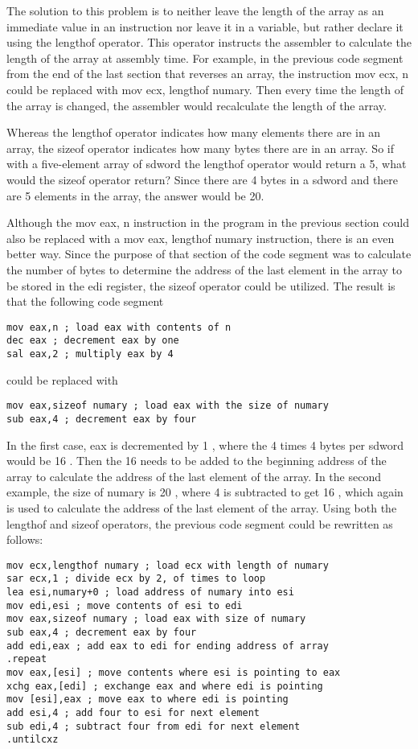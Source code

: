 \documentclass[10pt]{article}
\begin{document}
The solution to this problem is to neither leave the length of the array as an immediate value in an instruction nor leave it in a variable, but rather declare it using the lengthof operator. This operator instructs the assembler to calculate the length of the array at assembly time. For example, in the previous code segment from the end of the last section that reverses an array, the instruction mov ecx, n could be replaced with mov ecx, lengthof numary. Then every time the length of the array is changed, the assembler would recalculate the length of the array.

Whereas the lengthof operator indicates how many elements there are in an array, the sizeof operator indicates how many bytes there are in an array. So if with a five-element array of sdword the lengthof operator would return a 5, what would the sizeof operator return? Since there are 4 bytes in a sdword and there are 5 elements in the array, the answer would be 20.

Although the mov eax, n instruction in the program in the previous section could also be replaced with a mov eax, lengthof numary instruction, there is an even better way. Since the purpose of that section of the code segment was to calculate the number of bytes to determine the address of the last element in the array to be stored in the edi register, the sizeof operator could be utilized. The result is that the following code segment

\begin{verbatim}
mov eax,n ; load eax with contents of n
dec eax ; decrement eax by one
sal eax,2 ; multiply eax by 4
\end{verbatim}

could be replaced with

\begin{verbatim}
mov eax,sizeof numary ; load eax with the size of numary
sub eax,4 ; decrement eax by four
\end{verbatim}

In the first case, eax is decremented by 1 , where the 4 times 4 bytes per sdword would be 16 . Then the 16 needs to be added to the beginning address of the array to calculate the address of the last element of the array. In the second example, the size of numary is 20 , where 4 is subtracted to get 16 , which again is used to calculate the address of the last element of the array. Using both the lengthof and sizeof operators, the previous code segment could be rewritten as follows:

\begin{verbatim}
mov ecx,lengthof numary ; load ecx with length of numary
sar ecx,1 ; divide ecx by 2, of times to loop
lea esi,numary+0 ; load address of numary into esi
mov edi,esi ; move contents of esi to edi
mov eax,sizeof numary ; load eax with size of numary
sub eax,4 ; decrement eax by four
add edi,eax ; add eax to edi for ending address of array
.repeat
mov eax,[esi] ; move contents where esi is pointing to eax
xchg eax,[edi] ; exchange eax and where edi is pointing
mov [esi],eax ; move eax to where edi is pointing
add esi,4 ; add four to esi for next element
sub edi,4 ; subtract four from edi for next element
.untilcxz
\end{verbatim}
\end{document}
